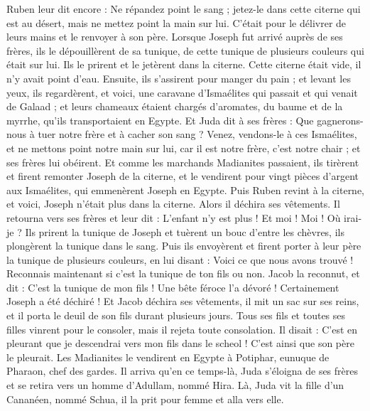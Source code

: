 \begin{multicols}{2}
Ruben leur dit encore : Ne répandez point le sang ; jetez-le dans cette citerne qui est au désert, mais ne mettez point la main sur lui. C'était pour le délivrer de leurs mains et le renvoyer à son père.
Lorsque Joseph fut arrivé auprès de ses frères, ils le dépouillèrent de sa tunique, de cette tunique de plusieurs couleurs qui était sur lui.
Ils le prirent et le jetèrent dans la citerne. Cette citerne était vide, il n'y avait point d'eau.
Ensuite, ils s'assirent pour manger du pain ; et levant les yeux, ils regardèrent, et voici, une caravane d'Ismaélites qui passait et qui venait de Galaad ; et leurs chameaux étaient chargés d'aromates, du baume et de la myrrhe, qu'ils transportaient en Egypte.
Et Juda dit à ses frères : Que gagnerons-nous à tuer notre frère et à cacher son sang ?
Venez, vendons-le à ces Ismaélites, et ne mettons point notre main sur lui, car il est notre frère, c'est notre chair ; et ses frères lui obéirent.
Et comme les marchands Madianites passaient, ils tirèrent et firent remonter Joseph de la citerne, et le vendirent pour vingt pièces d'argent aux Ismaélites, qui emmenèrent Joseph en Egypte.
Puis Ruben revint à la citerne, et voici, Joseph n'était plus dans la citerne. Alors il déchira ses vêtements.
Il retourna vers ses frères et leur dit : L'enfant n'y est plus ! Et moi ! Moi ! Où irai-je ?
Ils prirent la tunique de Joseph et tuèrent un bouc d'entre les chèvres, ils plongèrent la tunique dans le sang.
Puis ils envoyèrent et firent porter à leur père la tunique de plusieurs couleurs, en lui disant : Voici ce que nous avons trouvé ! Reconnais maintenant si c'est la tunique de ton fils ou non.
Jacob la reconnut, et dit : C'est la tunique de mon fils ! Une bête féroce l'a dévoré ! Certainement Joseph a été déchiré !
Et Jacob déchira ses vêtements, il mit un sac sur ses reins, et il porta le deuil de son fils durant plusieurs jours.
Tous ses fils et toutes ses filles vinrent pour le consoler, mais il rejeta toute consolation. Il disait : C'est en pleurant que je descendrai vers mon fils dans le scheol ! C'est ainsi que son père le pleurait.
Les Madianites le vendirent en Egypte à Potiphar, eunuque de Pharaon, chef des gardes.
\VerseOne{}Il arriva qu'en ce temps-là, Juda s'éloigna de ses frères et se retira vers un homme d'Adullam, nommé Hira.
Là, Juda vit la fille d'un Cananéen, nommé Schua, il la prit pour femme et alla vers elle.

\end{multicols}
